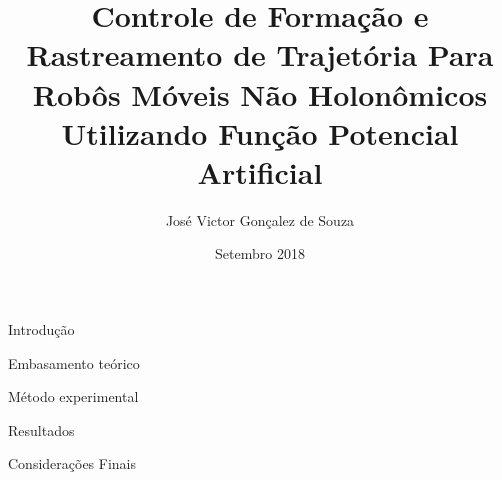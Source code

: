 \documentclass{beamer}
\title[Controle de Formação]{Controle de Formação e Rastreamento de Trajetória Para Robôs Móveis Não Holonômicos Utilizando Função Potencial Artificial}
\author{José Victor Gonçalez de Souza}
\date{Setembro 2018}
\begin{document}
\frame{\titlepage}

\begin{frame}{Introdução}

\end{frame}

\begin{frame}{Embasamento teórico}
    
\end{frame}

\begin{frame}{Método experimental}
    
\end{frame}

\begin{frame}{Resultados}
    
\end{frame}

\begin{frame}{Considerações Finais}
    
\end{frame}
\end{document}

